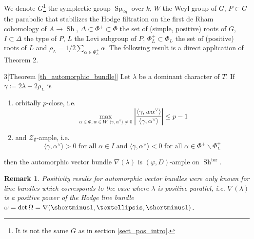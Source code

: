 \documentclass[11pt]{amsart}
\numberwithin{subsection}{section}
\numberwithin{figure}{section}
\numberwithin{table}{section}
\theoremstyle{1}
\theoremstyle{2}
\newtheorem*{rmrk*}{Remark}
\DeclareMathOperator{\Sp}{Sp}
\DeclareMathOperator{\Sh}{Sh}
\DeclareMathOperator{\tor}{tor}
\begin{document}
We denote $G$\footnote{It is not the same $G$ as in section \ref{sect_pos_intro}.} the symplectic group $\Sp_{2g}$ over $k$, $W$ the Weyl group of $G$, $P \subset G$ the parabolic that stabilizes the Hodge filtration on the first de Rham cohomology of $A \rightarrow \Sh$, $\Delta \subset \Phi^+ \subset \Phi$ the set of (simple, positive) roots of $G$, $I \subset \Delta$ the type of $P$, $L$ the Levi subgroup of $P$, $\Phi_L^{+} \subset \Phi_L$ the set of (positive) roots of $L$ and $\rho_L = 1/2\sum_{\alpha \in \Phi_L^{+}} \alpha$. The following result is a direct application of Theorem 2.
\begin{customthm}{3}[Theorem \ref{th_automorphic_bundle}]
Let $\lambda$ be a dominant character of $T$. If $\gamma := 2\lambda+2\rho_L$ is
\begin{enumerate}
\item orbitally $p$-close, i.e.
\begin{equation*}
\max_{\alpha \in \Phi, w \in W, \langle \gamma,\alpha^{\vee} \rangle \neq 0} | \frac{\langle \gamma,w\alpha^{\vee}\rangle}{\langle \gamma,\alpha^{\vee} \rangle }| \leq p-1
\end{equation*}
\item  and $\mathcal{Z}_{\emptyset}$-ample, i.e.
\begin{equation*}
\langle \gamma, \alpha^{\vee}\rangle >0 \text{ for all } \alpha \in I \text{ and } \langle \gamma, \alpha^{\vee}\rangle <0 \text{ for all } \alpha \in \Phi^+ \backslash \Phi^+_L
\end{equation*}
\end{enumerate}
then the automorphic vector bundle $\nabla(\lambda)$ is $(\varphi,D)$-ample on $\Sh^{\tor}$. 
\end{customthm}
\begin{rmrk*}
Positivity results for automorphic vector bundles were only known for line bundles which corresponds to the case where $\lambda$ is positive parallel, i.e. $\nabla(\lambda)$ is a positive power of the Hodge line bundle $\omega = \det \Omega = \nabla(\shortminus 1, \ldots, \shortminus 1)$.
\end{rmrk*}
\end{document}
